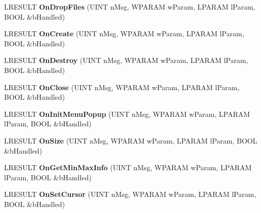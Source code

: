 \begin{DoxyCompactItemize}
\item 
\mbox{\label{class_c_main_window_a5756d2735dd88cc4341cbcd77837dc56}} 
L\+R\+E\+S\+U\+LT {\bfseries On\+Drop\+Files} (U\+I\+NT n\+Msg, W\+P\+A\+R\+AM w\+Param, L\+P\+A\+R\+AM l\+Param, B\+O\+OL \&b\+Handled)
\item 
\mbox{\label{class_c_main_window_acae5d52f375d8a65cb7d8049fab0f3ac}} 
L\+R\+E\+S\+U\+LT {\bfseries On\+Create} (U\+I\+NT n\+Msg, W\+P\+A\+R\+AM w\+Param, L\+P\+A\+R\+AM l\+Param, B\+O\+OL \&b\+Handled)
\item 
\mbox{\label{class_c_main_window_adec11fd59bdf52f0acb5bde05e11f73a}} 
L\+R\+E\+S\+U\+LT {\bfseries On\+Destroy} (U\+I\+NT n\+Msg, W\+P\+A\+R\+AM w\+Param, L\+P\+A\+R\+AM l\+Param, B\+O\+OL \&b\+Handled)
\item 
\mbox{\label{class_c_main_window_a6d1751a0c2257673282c6b0bc1882f26}} 
L\+R\+E\+S\+U\+LT {\bfseries On\+Close} (U\+I\+NT n\+Msg, W\+P\+A\+R\+AM w\+Param, L\+P\+A\+R\+AM l\+Param, B\+O\+OL \&b\+Handled)
\item 
\mbox{\label{class_c_main_window_a93554e414d2f5a4f4a91b2601593f5af}} 
L\+R\+E\+S\+U\+LT {\bfseries On\+Init\+Menu\+Popup} (U\+I\+NT n\+Msg, W\+P\+A\+R\+AM w\+Param, L\+P\+A\+R\+AM l\+Param, B\+O\+OL \&b\+Handled)
\item 
\mbox{\label{class_c_main_window_a5e4fb14a3351669ff5a4d6ff7ee6c374}} 
L\+R\+E\+S\+U\+LT {\bfseries On\+Size} (U\+I\+NT n\+Msg, W\+P\+A\+R\+AM w\+Param, L\+P\+A\+R\+AM l\+Param, B\+O\+OL \&b\+Handled)
\item 
\mbox{\label{class_c_main_window_ab018917faa7378c2fc5b871c6240ddb9}} 
L\+R\+E\+S\+U\+LT {\bfseries On\+Get\+Min\+Max\+Info} (U\+I\+NT n\+Msg, W\+P\+A\+R\+AM w\+Param, L\+P\+A\+R\+AM l\+Param, B\+O\+OL \&b\+Handled)
\item 
\mbox{\label{class_c_main_window_a5c0d32f4aec9f8b4c71cc25f57c63fc2}} 
L\+R\+E\+S\+U\+LT {\bfseries On\+Set\+Cursor} (U\+I\+NT n\+Msg, W\+P\+A\+R\+AM w\+Param, L\+P\+A\+R\+AM l\+Param, B\+O\+OL \&b\+Handled)

\end{DoxyCompactItemize}
